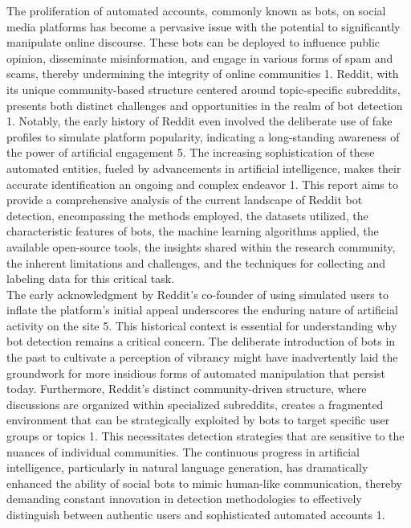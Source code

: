 \documentclass[
  12pt,
  letterpaper,
  DIV=11,
  numbers=noendperiod]{scrartcl}
\begin{document}
The proliferation of automated accounts, commonly known as bots, on
social media platforms has become a pervasive issue with the potential
to significantly manipulate online discourse. These bots can be deployed
to influence public opinion, disseminate misinformation, and engage in
various forms of spam and scams, thereby undermining the integrity of
online communities 1. Reddit, with its unique community-based structure
centered around topic-specific subreddits, presents both distinct
challenges and opportunities in the realm of bot detection 1. Notably,
the early history of Reddit even involved the deliberate use of fake
profiles to simulate platform popularity, indicating a long-standing
awareness of the power of artificial engagement 5. The increasing
sophistication of these automated entities, fueled by advancements in
artificial intelligence, makes their accurate identification an ongoing
and complex endeavor 1. This report aims to provide a comprehensive
analysis of the current landscape of Reddit bot detection, encompassing
the methods employed, the datasets utilized, the characteristic features
of bots, the machine learning algorithms applied, the available
open-source tools, the insights shared within the research community,
the inherent limitations and challenges, and the techniques for
collecting and labeling data for this critical task.\\
The early acknowledgment by Reddit's co-founder of using simulated users
to inflate the platform's initial appeal underscores the enduring nature
of artificial activity on the site 5. This historical context is
essential for understanding why bot detection remains a critical
concern. The deliberate introduction of bots in the past to cultivate a
perception of vibrancy might have inadvertently laid the groundwork for
more insidious forms of automated manipulation that persist today.
Furthermore, Reddit's distinct community-driven structure, where
discussions are organized within specialized subreddits, creates a
fragmented environment that can be strategically exploited by bots to
target specific user groups or topics 1. This necessitates detection
strategies that are sensitive to the nuances of individual communities.
The continuous progress in artificial intelligence, particularly in
natural language generation, has dramatically enhanced the ability of
social bots to mimic human-like communication, thereby demanding
constant innovation in detection methodologies to effectively
distinguish between authentic users and sophisticated automated accounts
1.
\end{document}
